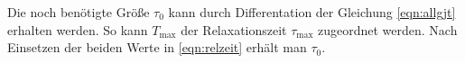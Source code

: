 Die noch benötigte Größe $\tau_0$ kann durch Differentation der Gleichung \eqref{eqn:allgjt} erhalten werden. So kann $T_\text{max}$ der Relaxationszeit $\tau_\text{max}$ zugeordnet werden. Nach Einsetzen der beiden Werte in \eqref{eqn:relzeit} erhält man $\tau_0$.

%
%
%
%
%

